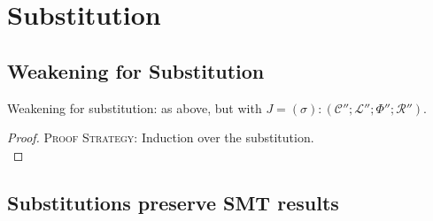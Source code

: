 \documentclass[11pt]{article}%
\newcommand{\ctxC}{\mathcal{C}}%
\newcommand{\ctxL}{\mathcal{L}}%
\newcommand{\ctxN}{\Phi}%
\newcommand{\ctxR}{\mathcal{R}}%
\begin{document}
\section{Substitution}

\subsection{Weakening for Substitution}

Weakening for substitution: as above, but with $J= ( \sigma ) : ( \ctxC'' ;
\ctxL'' ; \ctxN'' ; \ctxR'' )$.

\begin{proof}
    \textsc{Proof Strategy:} Induction over the substitution.\\


\end{proof}


\subsection{Substitutions preserve SMT results}\label{subsec:sub_smt}
\end{document}
